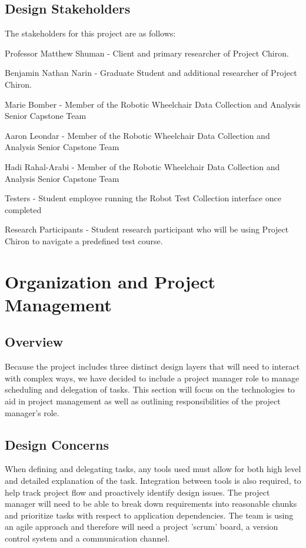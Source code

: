 \documentclass[onecolumn, draftclsnofoot,10pt, compsoc]{report}
\begin{document}
\subsection{Design Stakeholders}
The stakeholders for this project are as follows:
\begin{description}
	\item Professor Matthew Shuman - Client and primary researcher of Project Chiron.
	\item Benjamin Nathan Narin - Graduate Student and additional researcher of Project Chiron.
	\item Marie Bomber - Member of the Robotic Wheelchair Data Collection and Analysis Senior Capstone Team
	\item Aaron Leondar - Member of the Robotic Wheelchair Data Collection and Analysis Senior Capstone Team 
	\item Hadi Rahal-Arabi - Member of the Robotic Wheelchair Data Collection and Analysis Senior Capstone Team
	\item Testers - Student employee running the Robot Test Collection interface once completed
	\item Research Participants - Student research participant who will be using Project Chiron to navigate a predefined test course.
\end{description}
\section{Organization and Project Management}
\subsection{Overview}
Because the project includes three distinct design layers that will need to interact with complex ways, we have decided to include a project manager role to manage scheduling and delegation of tasks. This section will focus on the technologies to aid in project management as well as outlining responsibilities of the project manager's role. 
\subsection{Design Concerns}
When defining and delegating tasks, any tools used must allow for both high level and detailed explanation of the task. Integration between tools is also required, to help track project flow and proactively identify design issues. The project manager will need to be able to break down requirements into reasonable chunks and prioritize tasks with respect to application dependencies. The team is using an agile approach and therefore will need a project 'scrum' board, a version control system and a communication channel. 
\end{document}
